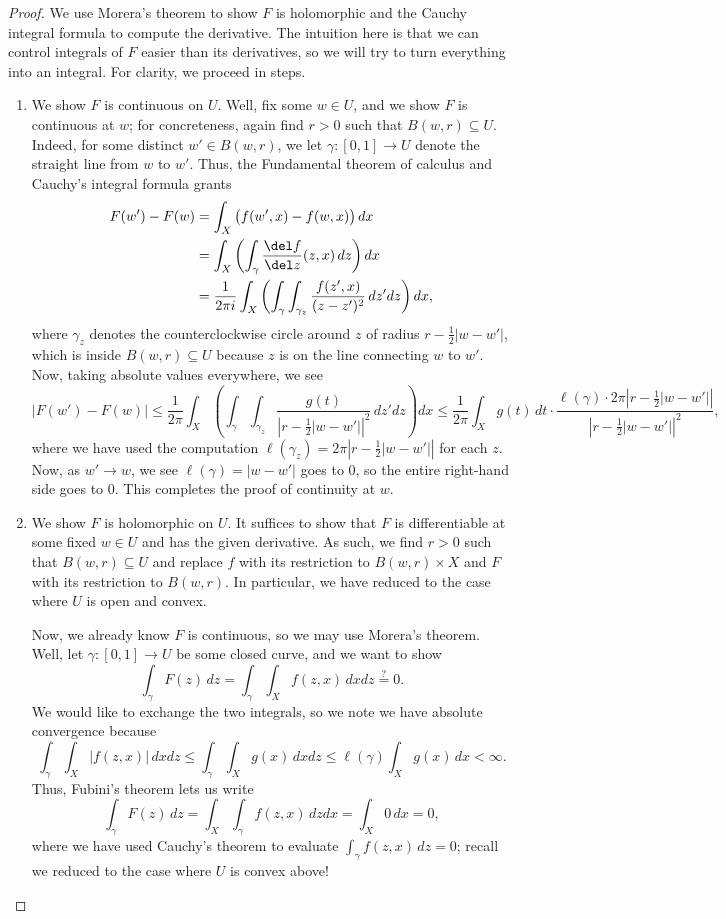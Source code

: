 \documentclass[notes.tex]{subfiles}
\begin{document}
\begin{proof}
	We use Morera's theorem to show $F$ is holomorphic and the Cauchy integral formula to compute the derivative. The intuition here is that we can control integrals of $F$ easier than its derivatives, so we will try to turn everything into an integral. For clarity, we proceed in steps.
	\begin{enumerate}
		\item We show $F$ is continuous on $U$. Well, fix some $w\in U$, and we show $F$ is continuous at $w$; for concreteness, again find $r>0$ such that $B(w,r)\subseteq U$. Indeed, for some distinct $w'\in B(w,r)$, we let $\gamma\colon[0,1]\to U$ denote the straight line from $w$ to $w'$. Thus, the Fundamental theorem of calculus and Cauchy's integral formula grants
		\begin{align*}
			F(w')-F(w) &= \int_X\big(f(w',x)-f(w,x)\big)\,dx \\
			&= \int_X\left(\int_\gamma\frac{\del f}{\del z}(z,x)\,dz\right)dx \\
			&= \frac1{2\pi i}\int_X\left(\int_\gamma\int_{\gamma_z}\frac{f(z',x)}{(z-z')^2}\,dz'dz\right)dx,
		\end{align*}
		where $\gamma_z$ denotes the counterclockwise circle around $z$ of radius $r-\frac12|w-w'|$, which is inside $B(w,r)\subseteq U$ because $z$ is on the line connecting $w$ to $w'$. Now, taking absolute values everywhere, we see
		\[|F(w')-F(w)|\le\frac1{2\pi}\int_X\left(\int_\gamma\int_{\gamma_z}\frac{g(t)}{\left|r-\frac12|w-w'|\right|^2}\,dz'dz\right)dx\le\frac1{2\pi}\int_Xg(t)\,dt\cdot\frac{\ell(\gamma)\cdot2\pi\left|r-\frac12|w-w'|\right|}{\left|r-\frac12|w-w'|\right|^2},\]
		where we have used the computation $\ell(\gamma_z)=2\pi\left|r-\frac12|w-w'|\right|$ for each $z$. Now, as $w'\to w$, we see $\ell(\gamma)=|w-w'|$ goes to $0$, so the entire right-hand side goes to $0$. This completes the proof of continuity at $w$.

		\item We show $F$ is holomorphic on $U$. It suffices to show that $F$ is differentiable at some fixed $w\in U$ and has the given derivative. As such, we find $r>0$ such that $B(w,r)\subseteq U$ and replace $f$ with its restriction to $B(w,r)\times X$ and $F$ with its restriction to $B(w,r)$. In particular, we have reduced to the case where $U$ is open and convex.
		
		Now, we already know $F$ is continuous, so we may use Morera's theorem. Well, let $\gamma\colon[0,1]\to U$ be some closed curve, and we want to show
		\[\int_\gamma F(z)\,dz=\int_\gamma\int_Xf(z,x)\,dxdz\stackrel?=0.\]
		We would like to exchange the two integrals, so we note we have absolute convergence because
		\[\int_\gamma\int_X|f(z,x)|\,dxdz\le\int_\gamma\int_Xg(x)\,dxdz\le\ell(\gamma)\int_Xg(x)\,dx<\infty.\]
		Thus, Fubini's theorem lets us write
		\[\int_\gamma F(z)\,dz=\int_X\int_\gamma f(z,x)\,dzdx=\int_X0\,dx=0,\]
		where we have used Cauchy's theorem to evaluate $\int_\gamma f(z,x)\,dz=0$; recall we reduced to the case where $U$ is convex above!


\end{enumerate}
\end{proof}
\end{document}
